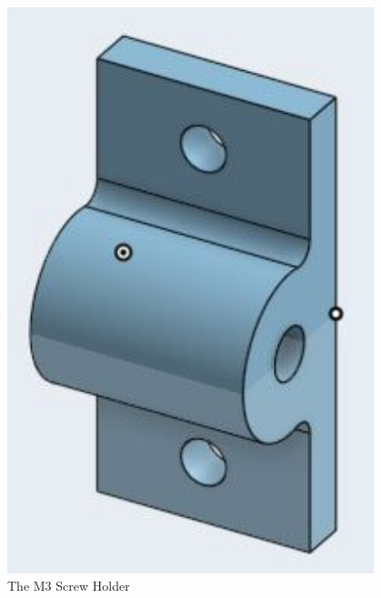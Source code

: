  

\begin{figure}[ht]
\centering
\begin{minipage}[b]{.48\textwidth}
  \centering
  \includegraphics[width=0.95\textwidth]{Meetings/November/11-08-21/11-8-21_Hardware_Figure1 - Nathan Forrer.JPG}
  \caption{The M3 Screw Holder}
  \label{fig:pic1}
\end{minipage}%
\hfill%
\begin{minipage}[b]{.48\textwidth}
  \centering

\end{minipage}
\end{figure}
